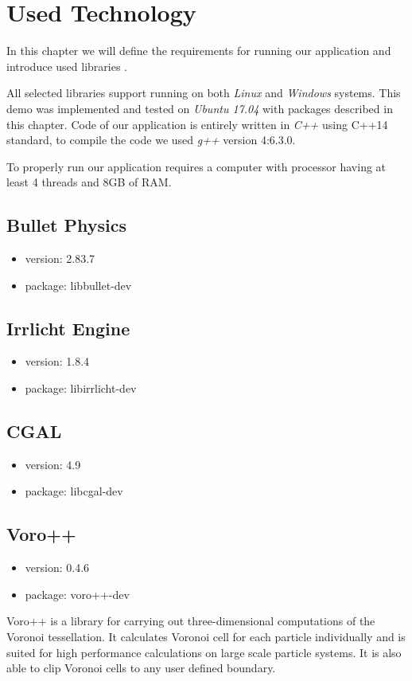 \chapter{Used Technology}
In this chapter we will define the requirements for running our application and introduce used libraries .

All selected libraries support running on both \emph{Linux} and \emph{Windows} systems. This demo was implemented and tested on \emph{Ubuntu 17.04} with packages described in this chapter. Code of our application is entirely written in \emph{C++} using C++14 standard, to compile the code we used \emph{g++} version 4:6.3.0.

To properly run our application requires a computer with processor having at least 4 threads and 8GB of RAM.

\section{Bullet Physics}
\begin{itemize}
\item version: 2.83.7
\item package: libbullet-dev
\end{itemize}


\section{Irrlicht Engine}
\begin{itemize}
\item version: 1.8.4
\item package: libirrlicht-dev
\end{itemize}

\section{CGAL}
\begin{itemize}
\item version: 4.9
\item package: libcgal-dev
\end{itemize}

\section{Voro++}
\begin{itemize}
\item version: 0.4.6
\item package: voro++-dev
\end{itemize}
Voro++ is a library for carrying out three-dimensional computations of the Voronoi tessellation. It calculates Voronoi cell for each particle individually and is suited for high performance calculations on large scale particle systems. It is also able to clip Voronoi cells to any user defined boundary.

